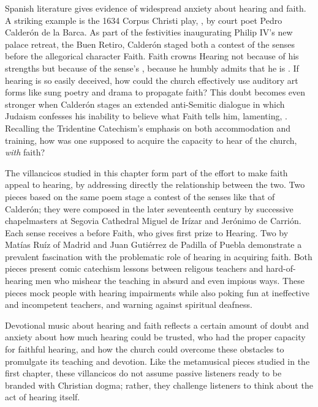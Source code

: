 \documentclass{vcbook-proposal}
\begin{document}
Spanish literature gives evidence of widespread anxiety about hearing and faith.
A striking example is the 1634 Corpus Christi play, , by court poet Pedro Calderón de la Barca.%
    \Autocite{Calderon:Retiro}
As part of the festivities inaugurating Philip IV's new palace retreat, the 
Buen Retiro, Calderón staged both a contest of the senses before the allegorical
character Faith.
Faith crowns Hearing not because of his strengths but because of the sense's 
, because he humbly admits that he is .
If hearing is so easily deceived, how could the church effectively use auditory
art forms like sung poetry and drama to propagate faith?  
This doubt becomes even stronger when Calderón stages an extended anti-Semitic 
dialogue in which Judaism confesses his inability to believe what Faith tells
him, lamenting, .
Recalling the Tridentine Catechism's emphasis on both accommodation and 
training, how was one supposed to acquire the capacity to hear  of the church, \emph{with} faith?

The villancicos studied in this chapter form part of the effort to make faith
appeal to hearing, by addressing directly the relationship between the two.
Two pieces based on the same poem stage a contest of the senses like that of
Calderón; they were composed in the later seventeenth century by successive
chapelmasters at Segovia Cathedral Miguel de Irízar and Jerónimo de Carrión.
Each sense receives a  before Faith, who gives first prize to
Hearing.
Two  by Matías Ruíz of Madrid and Juan 
Gutiérrez de Padilla of Puebla demonstrate a prevalent fascination with the 
problematic role of hearing in acquiring faith.
Both pieces present comic catechism lessons between religous teachers and 
hard-of-hearing men who mishear the teaching in absurd and even impious ways.
These pieces mock people with hearing impairments while also poking
fun at ineffective and incompetent teachers, and warning against spiritual
deafness.

Devotional music about hearing and faith reflects a certain amount of doubt and
anxiety about how much hearing could be trusted, who had the proper capacity for
faithful hearing, and how the church could overcome these obstacles to
promulgate its teaching and devotion.
Like the metamusical pieces studied in the first chapter, these villancicos do 
not assume passive listeners ready to be branded with Christian dogma; rather, 
they challenge listeners to think about the act of hearing itself.
\end{document}

